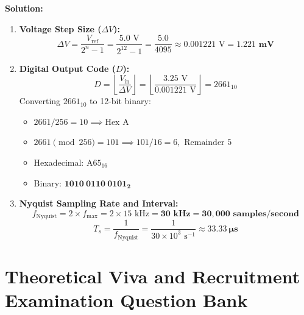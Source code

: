 \textbf{Solution:}
\begin{enumerate}[label=\bfseries\alph*.]
    \item \textbf{Voltage Step Size ($\Delta V$):}
    \[ \Delta V = \frac{V_{\text{ref}}}{2^n - 1} = \frac{5.0\text{ V}}{2^{12} - 1} = \frac{5.0}{4095} \approx 0.001221\text{ V} = \mathbf{1.221\text{ mV}} \]
    \item \textbf{Digital Output Code ($D$):}
    \[ D = \left\lfloor \frac{V_{\text{in}}}{\Delta V} \right\rfloor = \left\lfloor \frac{3.25\text{ V}}{0.001221\text{ V}} \right\rfloor = 2661_{10} \]
    Converting $2661_{10}$ to 12-bit binary:
    \begin{itemize}
        \item $2661 / 256 = 10 \implies \text{Hex } \text{A}$
        \item $2661 \pmod{256} = 101 \implies 101 / 16 = 6, \text{ Remainder } 5$
        \item Hexadecimal: $\text{A}65_{16}$
        \item Binary: $\mathbf{1010 \ 0110 \ 0101_2}$
    \end{itemize}
    \item \textbf{Nyquist Sampling Rate and Interval:}
    \[ f_{\text{Nyquist}} = 2 \times f_{\text{max}} = 2 \times 15\text{ kHz} = \mathbf{30\text{ kHz} = 30,000\text{ samples/second}} \]
    \[ T_s = \frac{1}{f_{\text{Nyquist}}} = \frac{1}{30 \times 10^3\text{ s}^{-1}} \approx \mathbf{33.33\ \mu\text{s}} \]
\end{enumerate}


\section{Theoretical Viva and Recruitment Examination Question Bank}
\label{sec:viva_questions}

